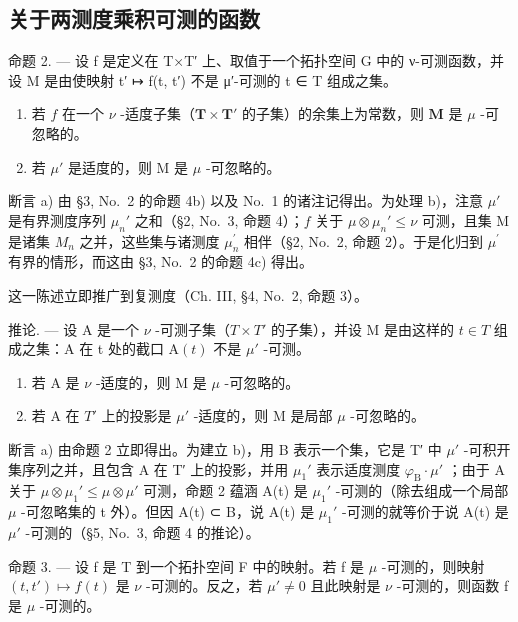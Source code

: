\subsection{关于两测度乘积可测的函数}

命题 2. --- 设 f 是定义在 T×T′ 上、取值于一个拓扑空间 G 中的 ν-可测函数，并设 M 是由使映射 t′ ↦ f(t, t′) 不是 μ′-可测的 t ∈ T 组成之集。

\begin{enumerate}
\def\labelenumi{\alph{enumi})}
\item
  若 \(f\) 在一个 \(\nu\) -适度子集（\(\mathbf{T} \times \mathbf{T}'\) 的子集）的余集上为常数，则 \(\mathbf{M}\) 是 \(\mu\) -可忽略的。
\item
  若 \(\mu'\) 是适度的，则 M 是 \(\mu\) -可忽略的。
\end{enumerate}

断言 a) 由 §3, No.~2 的命题 4b) 以及 No.~1 的诸注记得出。为处理 b)，注意 \(\mu'\) 是有界测度序列 \(\mu_n'\) 之和（§2, No.~3, 命题 4）；\(f\) 关于 \(\mu \otimes \mu_n' \leqslant \nu\) 可测，且集 M 是诸集 \(M_{n}\) 之并，这些集与诸测度 \(\mu_{n}^{\prime}\) 相伴（§2, No.~2, 命题 2）。于是化归到 \(\mu^{\prime}\) 有界的情形，而这由 §3, No.~2 的命题 4c) 得出。

这一陈述立即推广到复测度（Ch. III, §4, No.~2, 命题 3）。

推论. --- 设 A 是一个 \(\nu\) -可测子集（\(T \times T'\) 的子集），并设 M 是由这样的 \(t \in T\) 组成之集：A 在 t 处的截口 \(\mathrm{A}(t)\) 不是 \(\mu'\) -可测。

\begin{enumerate}
\def\labelenumi{\alph{enumi})}
\item
  若 A 是 \(\nu\) -适度的，则 M 是 \(\mu\) -可忽略的。
\item
  若 A 在 \(T'\) 上的投影是 \(\mu'\) -适度的，则 M 是局部 \(\mu\) -可忽略的。
\end{enumerate}

断言 a) 由命题 2 立即得出。为建立 b)，用 B 表示一个集，它是 T′ 中 \(\mu'\) -可积开集序列之并，且包含 A 在 T′ 上的投影，并用 \(\mu_1'\) 表示适度测度 \(\varphi_{\mathrm{B}} \cdot \mu'\) ；由于 A 关于 \(\mu \otimes \mu_1' \leqslant \mu \otimes \mu'\) 可测，命题 2 蕴涵 A(t) 是 \(\mu_1'\) -可测的（除去组成一个局部 \(\mu\) -可忽略集的 t 外）。但因 A(t) ⊂ B，说 A(t) 是 \(\mu_1'\) -可测的就等价于说 A(t) 是 \(\mu'\) -可测的（§5, No.~3, 命题 4 的推论）。

命题 3. --- 设 f 是 T 到一个拓扑空间 F 中的映射。若 f 是 \(\mu\) -可测的，则映射 \((t, t') \mapsto f(t)\) 是 \(\nu\) -可测的。反之，若 \(\mu' \neq 0\) 且此映射是 \(\nu\) -可测的，则函数 f 是 \(\mu\) -可测的。

